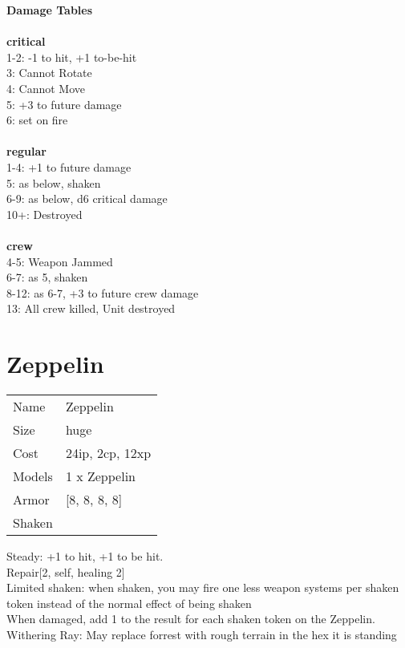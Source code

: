 {\bf Damage Tables} \\
\ \\ {\bf critical } \\
1-2: -1 to hit, +1 to-be-hit \\
3: Cannot Rotate \\
4: Cannot Move \\
5: +3 to future damage \\
6: set on fire \\
\ \\ {\bf regular } \\
1-4: +1 to future damage \\
5: as below, shaken \\
6-9: as below, d6 critical damage \\
10+: Destroyed \\
\ \\ {\bf crew } \\
4-5: Weapon Jammed \\
6-7: as 5, shaken \\
8-12: as 6-7, +3 to future crew damage \\
13: All crew killed, Unit destroyed \\










\pagebreak\pagebreak

\section{ Zeppelin }

\begin{tabular}{ll}
  Name & Zeppelin \\
  Size & huge\\
  Cost & 24ip, 2cp, 12xp\\
  Models & 1 x Zeppelin\\
  Armor & [8, 8, 8, 8]\\
  Shaken & \\
\end{tabular}

\noindent Steady: +1 to hit, +1 to be hit.\\ 
Repair[2, self, healing 2]\\ 
Limited shaken: when shaken, you may fire one less weapon systems per shaken token instead of the normal effect of being shaken\\ 
 When damaged, add 1 to the result for each shaken token on the Zeppelin.\\ 
Withering Ray: May replace forrest with rough terrain in the hex it is standing\\ 


